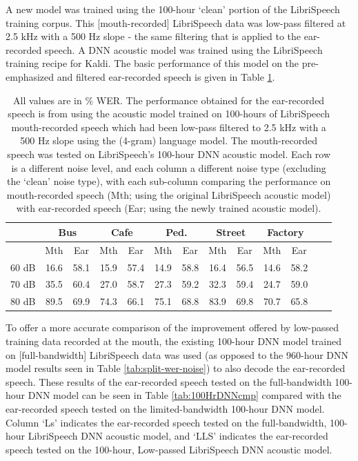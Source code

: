 A new model was trained using the 100-hour `clean' portion of the LibriSpeech training corpus.  This [mouth-recorded] LibriSpeech data was low-pass filtered at 2.5 kHz with a 500 Hz slope - the same filtering that is applied to the ear-recorded speech.  A DNN acoustic model was trained using the LibriSpeech training recipe for Kaldi. The basic performance of this model on the pre-emphasized and filtered ear-recorded speech is given in Table \ref{tab:retrainedDNN}.

\begin{table}[h]
\begin{center}
\begin{tabular}{| c || c | c | c | c | c | c | c | c | c | c | c | c |} \hline
      & \multicolumn{2}{|c|}{Bus} & \multicolumn{2}{|c|}{Cafe} & \multicolumn{2}{|c|}{Ped.} & \multicolumn{2}{|c|}{Street} & \multicolumn{2}{|c|}{Factory} \\ \hline
      & Mth & Ear & Mth & Ear & Mth & Ear & Mth & Ear & Mth & Ear \\ \hline\hline
60 dB & 16.6 & 58.1 & 15.9 & 57.4 & 14.9 & 58.8 & 16.4 & 56.5 & 14.6 & 58.2  \\ \hline
70 dB & 35.5 & 60.4 & 27.0 & 58.7 & 27.3 & 59.2 & 32.3 & 59.4 & 24.7 & 59.0  \\ \hline
80 dB & 89.5 & 69.9 & 74.3 & 66.1 & 75.1 & 68.8 & 83.9 & 69.8 & 70.7 & 65.8  \\ \hline
\end{tabular}
\end{center}
\caption{All values are in \% WER. The performance obtained for the ear-recorded speech is from using the acoustic model trained on 100-hours of LibriSpeech mouth-recorded speech which had been low-pass filtered to 2.5 kHz with a 500 Hz slope using the (4-gram) language model.  The mouth-recorded speech was tested on LibriSpeech's 100-hour DNN acoustic model.  Each row is a different noise level, and each column a different noise type (excluding the `clean' noise type), with each sub-column comparing the performance on mouth-recorded speech (Mth; using the original LibriSpeech acoustic model) with ear-recorded speech (Ear; using the newly trained acoustic model).}\label{tab:retrainedDNN}
\end{table}

To offer a more accurate comparison of the improvement offered by low-passed training data recorded at the mouth, the existing 100-hour DNN model trained on [full-bandwidth] LibriSpeech data was used (as opposed to the 960-hour DNN model results seen in Table \ref{tab:split-wer-noise}) to also decode the ear-recorded speech.  These results of the ear-recorded speech tested on the full-bandwidth 100-hour DNN model can be seen in Table \ref{tab:100HrDNNcmp} compared with the ear-recorded speech tested on the limited-bandwidth 100-hour DNN model.  Column `Ls' indicates the ear-recorded speech tested on the full-bandwidth, 100-hour LibriSpeech DNN acoustic model, and `LLS' indicates the ear-recorded speech tested on the 100-hour, Low-passed LibriSpeech DNN acoustic model.

